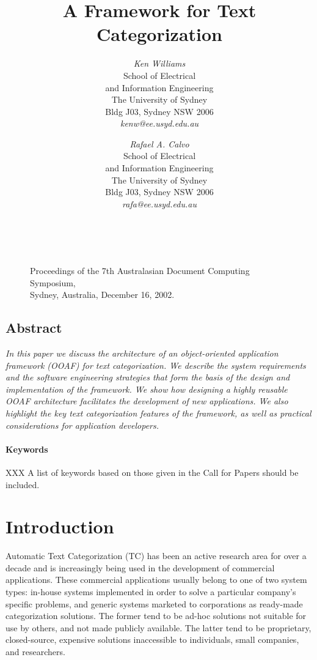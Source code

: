 \documentclass[twocolumn]{article}
\title{A Framework for Text Categorization}
\author{
{\em Ken Williams}\\[1ex]
School of Electrical\\
and Information Engineering\\
The University of Sydney\\
Bldg J03, Sydney NSW 2006\\[1ex]
{\em kenw@ee.usyd.edu.au}
\and
{\em Rafael A. Calvo}\\[1ex]
School of Electrical\\
and Information Engineering\\
The University of Sydney\\
Bldg J03, Sydney NSW 2006\\[1ex]
{\em rafa@ee.usyd.edu.au}
}
\date{}
\begin{document}
\maketitle
\thispagestyle{empty}


        \begin{figure}[b]
	~\\
        \noindent
        {\small\bf\raggedright
        Proceedings of the 7th Australasian 
	Document Computing Symposium,\\
	Sydney, Australia,
        December 16, 2002.
        }
        \end{figure}


\subsection*{\centering Abstract}
\noindent
{\it 
In this paper we discuss the architecture of an object-oriented
application framework (OOAF) for text categorization. We describe the
system requirements and the software engineering strategies that
form the basis of the design and implementation of the framework.  We show how
designing a highly reusable OOAF architecture facilitates the
development of new applications.  We also highlight the key text
categorization features of the framework, as well as practical
considerations for application developers.
}

\paragraph{Keywords} 
XXX A list of keywords based on those given in the Call for Papers should be included.


\section{Introduction}

Automatic Text Categorization (TC) has been an active research area
for over a decade and is increasingly being used in the development of
commercial applications.  These commercial applications usually belong to
one of two system types: in-house systems implemented in order to
solve a particular company's specific problems, and generic systems marketed to
corporations as ready-made categorization solutions.  The former tend
to be ad-hoc solutions not suitable for use by others, and not made
publicly available.  The
latter tend to be proprietary, closed-source, expensive solutions
inaccessible to individuals, small companies, and researchers.
\end{document}
